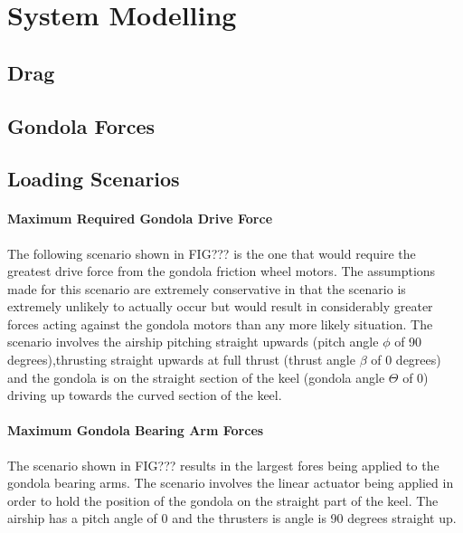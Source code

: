 \documentclass[../main.tex]{subfiles}
\begin{document}
\section{System Modelling} \label{modelling}
\subsection{Drag} \label{dragModelling}
\subsection{Gondola Forces} \label{gondForces}
\subsection{Loading Scenarios} \label{loadingScenarios}
\paragraph{Maximum Required Gondola Drive Force}
The following scenario shown in FIG??? is the one that would require the greatest drive force from the gondola friction wheel motors. The assumptions made for this scenario are extremely conservative in that the scenario is extremely unlikely to actually occur but would result in considerably greater forces acting against the gondola motors than any more likely situation. The scenario involves the airship pitching straight upwards (pitch angle $\phi$ of 90 degrees),thrusting straight upwards at full thrust (thrust angle $\beta$ of 0 degrees) and the gondola is on the straight section of the keel (gondola angle $\Theta$ of 0) driving up towards the curved section of the keel.

\paragraph{Maximum Gondola Bearing Arm Forces}
The scenario shown in FIG??? results in the largest fores being applied to the gondola bearing arms. The scenario involves the linear actuator being applied in order to hold the position of the gondola on the straight part of the keel. The airship has a pitch angle of 0 and the thrusters is  angle is 90 degrees straight up. 
\end{document}

